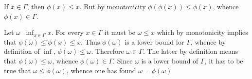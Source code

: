 \documentclass[a4paper]{article}
\newcommand{\brac}[1]{{\left ( #1 \right )}}
\newcommand{\defn}{\mathop{\overset{\Delta}{=}}\nolimits}
\begin{document}
If $x\in \Gamma$, then $\phi(x)\leq x$. But by monotonicity $\phi\brac{\phi(x)}\leq \phi(x)$, whence $\phi(x)\in \Gamma$.

Let $\omega \defn \inf_{x\in \Gamma} x$. For every $x\in \Gamma$ it must be $\omega\leq x$ which by monotonicity implies that $\phi(\omega)\leq \phi(x)\leq x$. Thus $\phi(\omega)$ is a lower bound for $\Gamma$, whence by definition of $\inf$, $\phi(\omega)\leq \omega$. Therefore $\omega\in \Gamma$. The latter by definition means that $\phi(\omega)\leq \omega$, whence $\phi(\omega)\in \Gamma$. Since $\omega$ is a lower bound of $\Gamma$, it has to be true that $\omega \leq \phi(\omega)$, whence one has found $\omega = \phi(\omega)$


\end{document}
